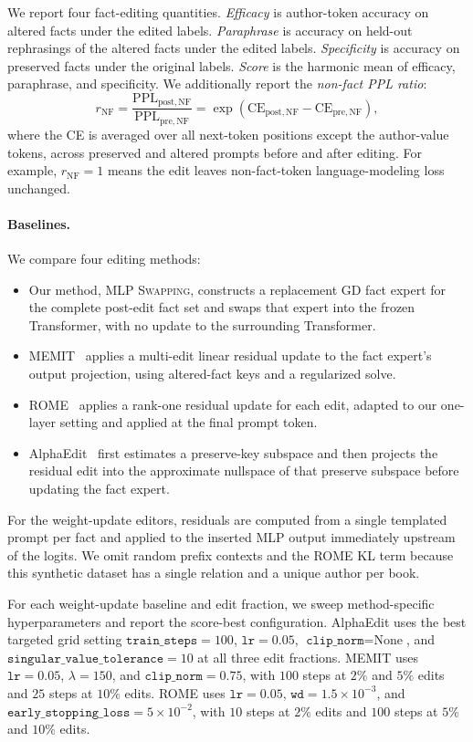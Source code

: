 We report four fact-editing quantities.
\emph{Efficacy} is author-token accuracy on altered facts under the edited labels.
\emph{Paraphrase} is accuracy on held-out rephrasings of the altered facts under the edited labels.
\emph{Specificity} is accuracy on preserved facts under the original labels.
\emph{Score} is the harmonic mean of efficacy, paraphrase, and specificity.
We additionally report the \emph{non-fact PPL ratio}:
\[
  r_{\mathrm{NF}}
  =
  \frac{\mathrm{PPL}_{\mathrm{post,NF}}}{\mathrm{PPL}_{\mathrm{pre,NF}}}
  =
  \exp\!\left(
    \mathrm{CE}_{\mathrm{post,NF}}-\mathrm{CE}_{\mathrm{pre,NF}}
  \right),
\]
where the CE is averaged over all next-token positions except the author-value tokens, across preserved and altered prompts before and after editing.
For example, \(r_{\mathrm{NF}}=1\) means the edit leaves non-fact-token
language-modeling loss unchanged.

\paragraph{Baselines.}
We compare four editing methods:
\begin{itemize}
    \item Our method, \textsc{MLP Swapping}, constructs a replacement GD fact expert for the complete post-edit fact set and swaps that expert into the frozen Transformer, with no update to the surrounding Transformer.
    \item MEMIT~\citep{memit} applies a multi-edit linear residual update to the fact expert's output projection, using altered-fact keys and a regularized solve.
    \item ROME~\citep{rome} applies a rank-one residual update for each edit, adapted to our one-layer setting and applied at the final prompt token.
    \item AlphaEdit~\citep{fang2025alphaeditnullspaceconstrainedknowledge} first estimates a preserve-key subspace and then projects the residual edit into the approximate nullspace of that preserve subspace before updating the fact expert.
\end{itemize}
For the weight-update editors, residuals are computed from a single templated prompt per fact and applied to the inserted MLP output immediately upstream of the logits. We omit random prefix contexts and the ROME KL term because this synthetic dataset has a single relation and a unique author per book.

For each weight-update baseline and edit fraction, we sweep method-specific
hyperparameters and report the score-best configuration. AlphaEdit uses the best targeted grid setting \(\texttt{train\_steps}=100\), \(\texttt{lr}=0.05\), \(\texttt{clip\_norm}=\text{None}\), and \(\texttt{singular\_value\_tolerance}=10\) at all three edit fractions.
MEMIT uses \(\texttt{lr}=0.05\), \(\lambda=150\), and \(\texttt{clip\_norm}=0.75\), with \(100\) steps at \(2\%\) and \(5\%\) edits and \(25\) steps at \(10\%\) edits.
ROME uses \(\texttt{lr}=0.05\), \(\texttt{wd}=1.5\times10^{-3}\), and \(\texttt{early\_stopping\_loss}=5\times10^{-2}\), with \(10\) steps at \(2\%\) edits and \(100\) steps at \(5\%\) and \(10\%\) edits.


